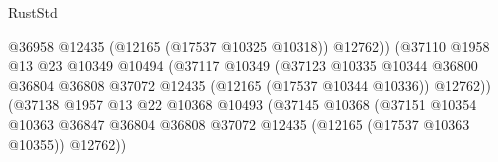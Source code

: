 \begin{lexlean}{RustStd}
\begin{coremodule}
                                                        @36958
                                                        @12435
                                                        (@12165 (@17537 @10325 @10318))
                                                        @12762))
                                                    (@37110
                                                      @1958
                                                      @13
                                                      @23
                                                      @10349
                                                      @10494
                                                      (@37117
                                                        @10349
                                                        (@37123
                                                          @10335
                                                          @10344
                                                          @36800
                                                          @36804
                                                          @36808
                                                          @37072
                                                          @12435
                                                          (@12165 (@17537 @10344 @10336))
                                                          @12762))
                                                      (@37138
                                                        @1957
                                                        @13
                                                        @22
                                                        @10368
                                                        @10493
                                                        (@37145
                                                          @10368
                                                          (@37151
                                                            @10354
                                                            @10363
                                                            @36847
                                                            @36804
                                                            @36808
                                                            @37072
                                                            @12435
                                                            (@12165 (@17537 @10363 @10355))
                                                            @12762))

\end{coremodule}
\end{lexlean}
